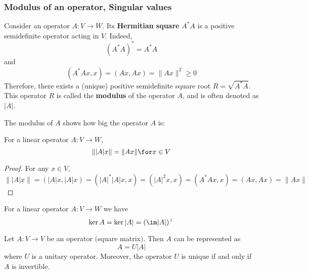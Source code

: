 \subsubsection{Modulus of an operator, Singular values}
Consider an operator $A:V\to W$. Its \textbf{Hermitian square} $A^*A$ is a positive semidefinite operator acting in $V$. Indeed,
\[(A^*A)^*=A^*A\]
and
\[(A^*Ax,x)=(Ax,Ax)=\|Ax\|^2\geq 0\]
Therefore, there exists a (unique) positive semidefinite square root $R=\sqrt{A^*A}$. This operator $R$ is called the \textbf{modulus} of the operator $A$, and is often denoted as $|A|$.\par
The modulus of $A$ shows how big the operator $A$ is:
\begin{proposition}\label{modulus prop}
For a linear operator $A:V\to W$,
\[\||A|x\|=\|Ax\|\for x\in V\]
\end{proposition}
\begin{proof}
For any $x\in V$,
\[\||A|x\|=(|A|x,|A|x)=(|A|^*|A|x,x)=(|A|^2x,x)=(A^*Ax,x)=(Ax,Ax)=\|Ax\|\]
\end{proof}
\begin{corollary}\label{modulus coro}
For a linear operator $A:V\to W$ we have
\[\ker A=\ker|A|=(\im|A|)^\bot\]
\end{corollary}
\begin{proposition}
Let $A:V\to V$ be an operator $($square matrix$)$. Then $A$ can be represented as
\[A=U|A|\]
where $U$ is a unitary operator. Moreover, the operator $U$ is unique if and only if $A$ is invertible.
\end{proposition}
